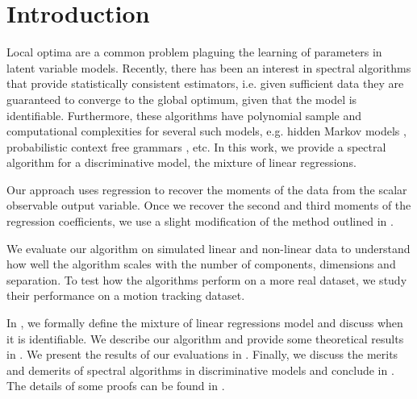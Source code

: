 \section{Introduction}
\label{sec:intro}

Local optima are a common problem plaguing the learning of parameters in
latent variable models. Recently, there has been an interest in spectral
algorithms that provide statistically consistent estimators, i.e. given
sufficient data they are guaranteed to converge to the global optimum,
given that the model is identifiable. Furthermore, these algorithms have
polynomial sample and computational complexities for several such
models, e.g.  hidden Markov models \cite{AnandkumarHsuKakade2012},
probabilistic context free grammars \cite{HsuKakadeLiang2012}, etc. In
this work, we provide a spectral algorithm for a discriminative model,
the mixture of linear regressions.


Our approach uses regression to recover the moments of the data from the
scalar observable output variable. Once we recover the second and third
moments of the regression coefficients, we use a slight modification of
the method outlined in \citet{AnandkumarHsuKakade2012}.

We evaluate our algorithm on simulated linear and non-linear data to
understand how well the algorithm scales with the number of components,
dimensions and separation. To test how the algorithms perform on a more
real dataset, we study their performance on a motion tracking dataset.

In , we formally define the mixture of linear
regressions model and discuss when it is identifiable. We describe our
algorithm and provide some theoretical results in . We
present the results of our evaluations in .
Finally, we discuss the merits and demerits of spectral algorithms in
discriminative models and conclude in . The
details of some proofs can be found in .


